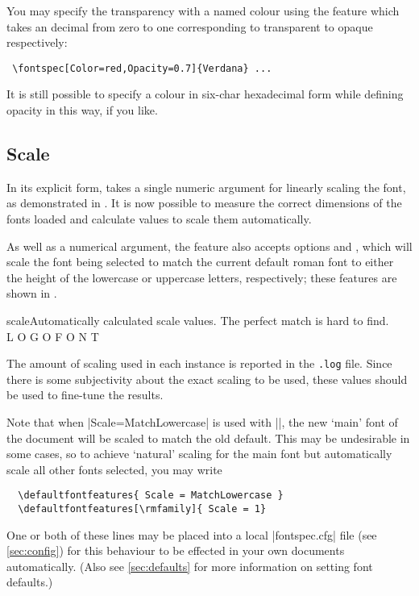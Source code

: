 You may specify the transparency with a named colour using the 
feature which takes an decimal from zero to one corresponding to
transparent to opaque respectively:
\begin{Verbatim}
 \fontspec[Color=red,Opacity=0.7]{Verdana} ...
\end{Verbatim}
It is still possible to specify a colour in six-char hexadecimal form
while defining opacity in this way, if you like.

\subsection{Scale}


In its explicit form,  takes a single
numeric argument for linearly scaling the font, as demonstrated
in .
It is now possible to
measure the correct dimensions of the fonts loaded and
calculate values to scale them automatically.

As well as a numerical argument, the  feature
also accepts options 
and , which will scale the font being selected to match
the current default roman font to either the height of the lowercase or
uppercase letters, respectively; these features are shown in .

\begin{Xexample}{scale}{Automatically calculated scale values.}
  \setmainfont{Georgia}
  \newfontfamily{}
   The perfect match {\lc is hard to find.}\\
  \newfontfamily{}
   L O G O \uc F O N T
\end{Xexample}

The amount of scaling used in each instance is reported in the \texttt{.log} file.
Since there is some subjectivity about the exact scaling to be used, these values
should be used to fine-tune the results.

Note that when |Scale=MatchLowercase| is used with |\setmainfont|, the new `main' font of the document will be scaled to match the old default.
This may be undesirable in some cases, so to achieve `natural' scaling for the main font but automatically scale all other fonts selected, you may write
\begin{Verbatim}
  \defaultfontfeatures{ Scale = MatchLowercase }
  \defaultfontfeatures[\rmfamily]{ Scale = 1}
\end{Verbatim}
One or both of these lines may be placed into a local |fontspec.cfg| file (see \vref{sec:config}) for this behaviour to be effected in your own documents automatically.
(Also see \vref{sec:defaults} for more information on setting font defaults.)



